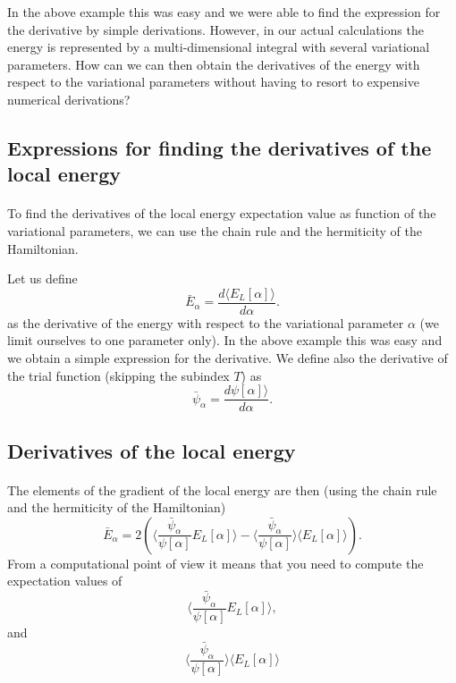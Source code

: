\documentclass[%
oneside,                 %
final,                   %
10pt]{article}
\begin{document}
In the above example this was easy and we were able to find the expression for the derivative by simple derivations. 
However, in our actual calculations the energy is represented by a multi-dimensional integral with several variational parameters.
How can we can then obtain the derivatives of the energy with respect to the variational parameters without having 
to resort to expensive numerical derivations?



\subsection*{Expressions for finding the derivatives of the local energy}

\paragraph{}

To find the derivatives of the local energy expectation value as function of the variational parameters, we can use the chain rule and the hermiticity of the Hamiltonian.  

Let us define 
\[
\bar{E}_{\alpha}=\frac{d\langle  E_L[\alpha]\rangle}{d\alpha}.
\]
as the derivative of the energy with respect to the variational parameter $\alpha$ (we limit ourselves to one parameter only).
In the above example this was easy and we obtain a simple expression for the derivative.
We define also the derivative of the trial function (skipping the subindex $T$) as 
\[
\bar{\psi}_{\alpha}=\frac{d\psi[\alpha]\rangle}{d\alpha}.
\]



\subsection*{Derivatives of the local energy}

\paragraph{}
The elements of the gradient of the local energy are then (using the chain rule and the hermiticity of the Hamiltonian)
\[
\bar{E}_{\alpha} = 2\left( \langle \frac{\bar{\psi}_{\alpha}}{\psi[\alpha]}E_L[\alpha]\rangle -\langle \frac{\bar{\psi}_{\alpha}}{\psi[\alpha]}\rangle\langle E_L[\alpha] \rangle\right).
\]
From a computational point of view it means that you need to compute the expectation values of 
\[
\langle \frac{\bar{\psi}_{\alpha}}{\psi[\alpha]}E_L[\alpha]\rangle,
\]
and
\[
\langle \frac{\bar{\psi}_{\alpha}}{\psi[\alpha]}\rangle\langle E_L[\alpha]\rangle
\]
\end{document}
